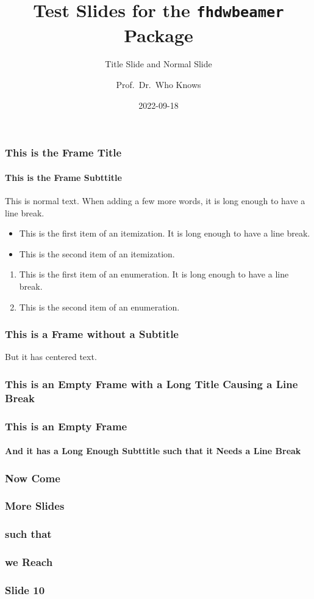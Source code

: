 \documentclass{beamer}
\title[Short Title]{Test Slides for the \texttt{fhdwbeamer} Package}
\subtitle{Title Slide and Normal Slide}
\author{Prof.\ Dr.\ Who Knows}
\date{2022-09-18}
\begin{document}
\begin{frame}
\titlepage
\end{frame}

\begin{frame}
\frametitle{This is the Frame Title}
\framesubtitle{This is the Frame Subttitle}
This is normal text. When adding a few more words, it is long enough to have a line break.
\begin{itemize}
\item This is the first item of an itemization. It is long enough to have a line break.
\item This is the second item of an itemization.
\end{itemize}
\begin{enumerate}
\item This is the first item of an enumeration. It is long enough to have a line break.
\item This is the second item of an enumeration.
\end{enumerate}
\end{frame}

\begin{frame}
\frametitle{This is a Frame without a Subtitle}
\centering
But it has centered text.
\end{frame}

\begin{frame}
\frametitle{This is an Empty Frame with a Long Title Causing a Line Break}
\end{frame}

\begin{frame}
\frametitle{This is an Empty Frame}
\framesubtitle{And it has a Long Enough Subttitle such that it Needs a Line Break}
\end{frame}

\begin{frame}
\frametitle{Now Come}
\end{frame}

\begin{frame}
\frametitle{More Slides}
\end{frame}

\begin{frame}
\frametitle{such that}
\end{frame}

\begin{frame}
\frametitle{we Reach}
\end{frame}

\begin{frame}
\frametitle{Slide 10}
\end{frame}
\end{document}
